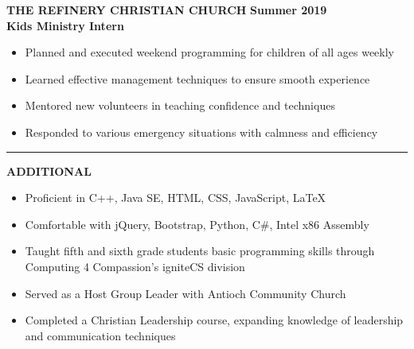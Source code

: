 \documentclass[11pt]{article}
\newenvironment{resumebulletcategory}[1]{
    \begin{spacing}{1.1}
        \textbf{\Large \uppercase{#1}}
        \begin{itemize}[topsep=1pt,itemsep=1pt,partopsep=.5pt, parsep=.5pt]
}{
        \end{itemize}
    \end{spacing}
}
\newcommand*{\resumeseparator}{
    \begin{spacing}{1.1}
        \noindent\rule{\textwidth}{1pt}
    \end{spacing}
}
\begin{document}
\begin{spacing}{1.1}
        \textbf{\uppercase {The Refinery Christian Church}} \hfill \textbf{Summer 2019}\\
        \textbf{Kids Ministry Intern}
        \begin{itemize}[topsep=1pt,itemsep=1pt,partopsep=.5pt, parsep=.5pt]
            \item Planned and executed weekend programming for children of all ages weekly
            \item Learned effective management techniques to ensure smooth experience
            \item Mentored new volunteers in teaching confidence and techniques
            \item Responded to various emergency situations with calmness and efficiency
        \end{itemize}
		
        \resumeseparator
		
        \begin{resumebulletcategory}{Additional}
            \item Proficient in C++, Java SE, HTML, CSS, JavaScript, LaTeX
            \item Comfortable with jQuery, Bootstrap, Python, C\#, Intel x86 Assembly
            \item Taught fifth and sixth grade students basic programming skills through Computing 4 Compassion's igniteCS division
            \item Served as a Host Group Leader with Antioch Community Church
            \item Completed a Christian Leadership course, expanding knowledge of leadership and communication techniques
        \end{resumebulletcategory}
	\end{spacing}
\end{document}
